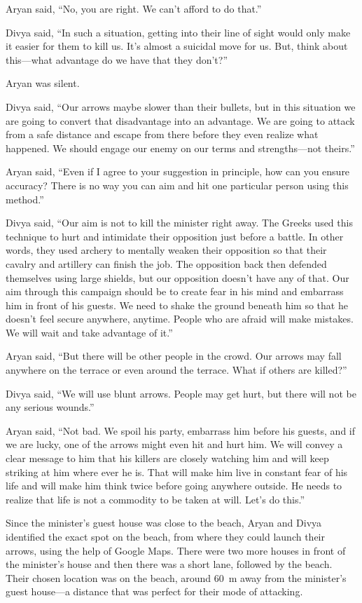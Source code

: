 Aryan said, “No, you are right. We can't afford to do that.”

Divya said, “In such a situation, getting into their line of sight would only
make it easier for them to kill us. It's almost a suicidal move for us. But,
think about this—what advantage do we have that they don't?”

Aryan was silent.

Divya said, “Our arrows maybe slower than their bullets, but in this situation
we are going to convert that disadvantage into an advantage. We are going to
attack from a safe distance and escape from there before they even realize what
happened. We should engage our enemy on our terms and strengths—not theirs.”

Aryan said, “Even if I agree to your suggestion in principle, how can you ensure
accuracy? There is no way you can aim and hit one particular person using this
method.”

Divya said, “Our aim is not to kill the minister right away. The Greeks used
this technique to hurt and intimidate their opposition just before a battle. In
other words, they used archery to mentally weaken their opposition so that their
cavalry and artillery can finish the job. The opposition back then defended
themselves using large shields, but our opposition doesn't have any of that. Our
aim through this campaign should be to create fear in his mind and embarrass him
in front of his guests. We need to shake the ground beneath him so that he
doesn't feel secure anywhere, anytime. People who are afraid will make mistakes.
We will wait and take advantage of it.”

Aryan said, “But there will be other people in the crowd. Our arrows may fall
anywhere on the terrace or even around the terrace. What if others are killed?”

Divya said, “We will use blunt arrows. People may get hurt, but there will not
be any serious wounds.”

Aryan said, “Not bad. We spoil his party, embarrass him before his guests, and
if we are lucky, one of the arrows might even hit and hurt him. We will convey a
clear message to him that his killers are closely watching him and will keep
striking at him where ever he is. That will make him live in constant fear of
his life and will make him think twice before going anywhere outside. He needs to
realize that life is not a commodity to be taken at will. Let's do this.”

Since the minister's guest house was close to the beach, Aryan and Divya
identified the exact spot on the beach, from where they could launch their
arrows, using the help of Google Maps. There were two more houses in front of
the minister's house and then there was a short lane, followed by the beach.
Their chosen location was on the beach, around 60 m away from the minister's
guest house—a distance that was perfect for their mode of attacking.

